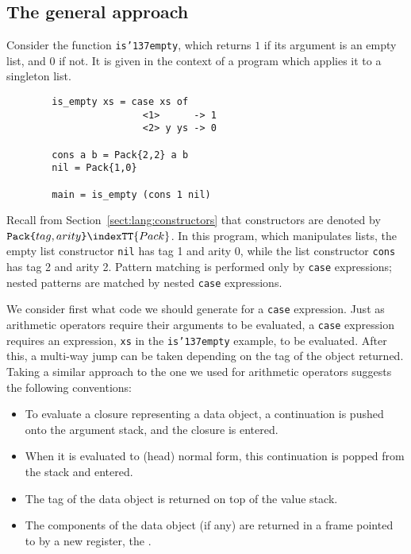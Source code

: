 \subsection{The general approach}

Consider the function \mbox{\tt is{\char'137}empty}, which returns $1$ if its argument
is an empty list, and $0$ if not.
It is given in the context of a program which applies it to a singleton list.
\begin{verbatim}
        is_empty xs = case xs of
                        <1>      -> 1
                        <2> y ys -> 0

        cons a b = Pack{2,2} a b
        nil = Pack{1,0}

        main = is_empty (cons 1 nil)
\end{verbatim}

Recall from Section~\ref{sect:lang:constructors} that constructors are
denoted by $\mbox{\tt Pack{\char'173}}tag,arity\mbox{\tt {\char'175}}\indexTT{Pack}$.  In this program, which manipulates
lists, the empty list constructor \mbox{\tt nil} has tag
1 and arity 0, while
the list constructor \mbox{\tt cons} has tag 2 and arity 2.   Pattern matching
is performed only by \mbox{\tt case} expressions; nested patterns are matched
by nested \mbox{\tt case} expressions.

We consider first what code we should generate for a \mbox{\tt case} expression.
Just as arithmetic operators require their arguments to be evaluated,
a \mbox{\tt case} expression requires an expression, \mbox{\tt xs} in the \mbox{\tt is{\char'137}empty} example,
to be evaluated.  After this, a multi-way jump can be taken depending on
the tag of the object returned.  Taking a similar approach to the one
we used for arithmetic
operators suggests the following conventions:
\begin{itemize}
\item
To evaluate a closure representing a
data object, a continuation is pushed onto the argument
stack, and the closure is entered.
\item
When it is evaluated to (head) normal form, this continuation is popped
from the stack and entered.
\item
The tag of the data object is returned on top of the value stack.
\item
The components of the data object (if any) are returned in a frame pointed
to by a new register, the .
\end{itemize}

